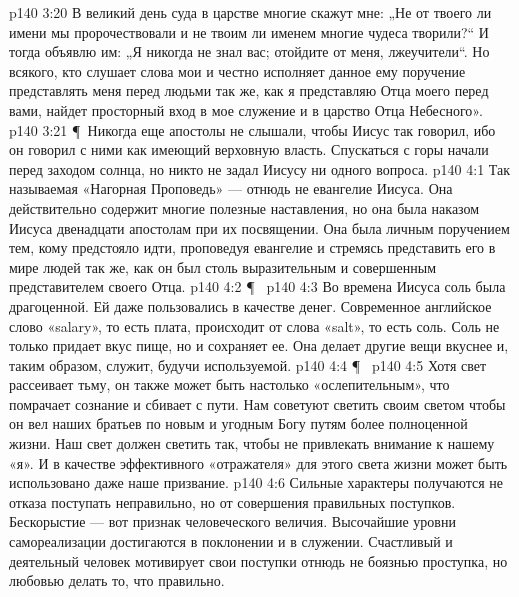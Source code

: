 \vs p140 3:20 В великий день суда в царстве многие скажут мне: „Не от твоего ли имени мы пророчествовали и не твоим ли именем многие чудеса творили?“ И тогда объявлю им: „Я никогда не знал вас; отойдите от меня, лжеучители“. Но всякого, кто слушает слова мои и честно исполняет данное ему поручение представлять меня перед людьми так же, как я представляю Отца моего перед вами, найдет просторный вход в мое служение и в царство Отца Небесного».
\vs p140 3:21 \P\ Никогда еще апостолы не слышали, чтобы Иисус так говорил, ибо он говорил с ними как имеющий верховную власть. Спускаться с горы начали перед заходом солнца, но никто не задал Иисусу ни одного вопроса.
\vs p140 4:1 Так называемая «Нагорная Проповедь» --- отнюдь не евангелие Иисуса. Она действительно содержит многие полезные наставления, но она была наказом Иисуса двенадцати апостолам при их посвящении. Она была личным поручением тем, кому предстояло идти, проповедуя евангелие и стремясь представить его в мире людей так же, как он был столь выразительным и совершенным представителем своего Отца.
\vs p140 4:2 \P\ 
\vs p140 4:3 Во времена Иисуса соль была драгоценной. Ей даже пользовались в качестве денег. Современное английское слово «salary», то есть плата, происходит от слова «salt», то есть соль. Соль не только придает вкус пище, но и сохраняет ее. Она делает другие вещи вкуснее и, таким образом, служит, будучи используемой.
\vs p140 4:4 \P\ 
\vs p140 4:5 Хотя свет рассеивает тьму, он также может быть настолько «ослепительным», что помрачает сознание и сбивает с пути. Нам советуют светить своим светом  чтобы он вел наших братьев по новым и угодным Богу путям более полноценной жизни. Наш свет должен светить так, чтобы не привлекать внимание к нашему «я». И в качестве эффективного «отражателя» для этого света жизни может быть использовано даже наше призвание.
\vs p140 4:6 Сильные характеры получаются не  отказа поступать неправильно, но от совершения правильных поступков. Бескорыстие --- вот признак человеческого величия. Высочайшие уровни самореализации достигаются в поклонении и в служении. Счастливый и деятельный человек мотивирует свои поступки отнюдь не боязнью проступка, но любовью делать то, что правильно.
